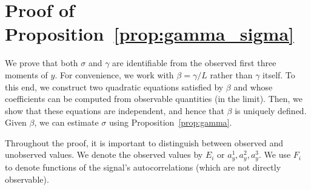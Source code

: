\documentclass[12pt]{article}
\newcommand{\1}{\mathbf{1}}
\theoremstyle{plain}
\theoremstyle{definition}
\theoremstyle{remark}
\theoremstyle{plain}
\theoremstyle{remark}
\theoremstyle{plain}
\theoremstyle{plain}
\begin{document}
\section{Proof of Proposition~\ref{prop:gamma_sigma}} \label{sec:proof_prop_gamma_sigma}

We prove that both $\sigma$ and $\gamma$ are identifiable from the observed first three moments of $y$. For convenience, we work with $\beta = \gamma / L$ rather than $\gamma$ itself. To this end, we construct two quadratic equations satisfied by $\beta$ and whose coefficients can be computed from observable quantities (in the limit). Then, we show that these equations are independent, and hence that $\beta$ is uniquely defined. Given $\beta$, we can estimate $\sigma$ using Proposition~\ref{prop:gamma}.

Throughout the proof, it is important to distinguish between observed and unobserved values.
We denote the observed values by $E_i$ or $a_y^1,a_y^2,a_y^3$. We use $F_i$ to denote functions of the signal's autocorrelations (which are not directly observable).
\end{document}
